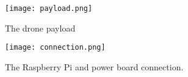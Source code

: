 \documentclass[../main.tex]{subfiles}
\begin{document}
\begin{figure}[bt]
	\centering
	\texttt{[image: payload.png]}
	\caption{The drone payload}
	\label{fig:payload}
\end{figure}  

\begin{figure}[h]
	\centering
	\texttt{[image: connection.png]}
	\caption{The Raspberry Pi and power board connection.}
	\label{fig:connection}
\end{figure}     
\end{document}
